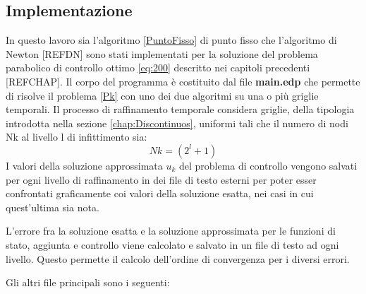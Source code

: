 \subsection{Implementazione}
In questo lavoro sia l'algoritmo \ref{PuntoFisso} di punto fisso che l'algoritmo di Newton [REFDN] sono stati implementati per la soluzione del problema parabolico di controllo ottimo \eqref{eq:200} descritto nei capitoli precedenti [REFCHAP].
Il corpo del programma è costituito dal file \textbf{main.edp} che permette di risolve il problema \ref{Pk} con uno dei due algoritmi su una o più griglie temporali. Il processo di raffinamento temporale considera griglie, della tipologia introdotta nella sezione \ref{chap:Discontinuos}, uniformi tali che il numero di nodi Nk al livello l di infittimento sia:
\begin{equation}
Nk = ( 2^l + 1 )
\label{Nk}
\end{equation}
I valori della soluzione approssimata $u_k$ del problema di controllo vengono salvati per ogni livello di raffinamento in dei file di testo esterni per poter esser confrontati graficamente coi valori della soluzione esatta, nei casi in cui quest'ultima sia nota.
\par
L'errore fra la soluzione esatta e la soluzione approssimata per le funzioni di stato, aggiunta e controllo viene calcolato e salvato in un file di testo ad ogni livello. Questo permette il calcolo dell'ordine di convergenza per i diversi errori.
\par
Gli altri file principali sono i seguenti:
